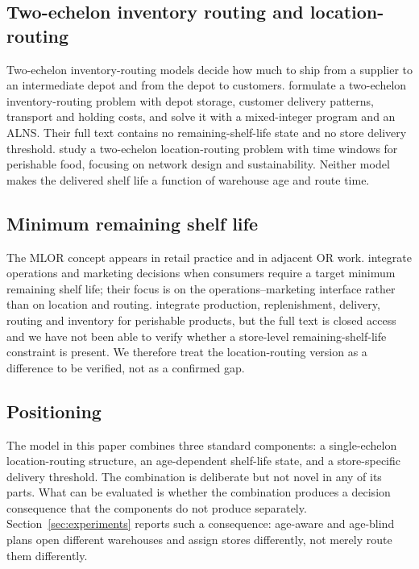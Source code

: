 \documentclass[preprint,12pt]{elsarticle}
\begin{document}
\subsection{Two-echelon inventory routing and location-routing}

Two-echelon inventory-routing models decide how much to ship from a supplier to an intermediate depot and from the depot to customers. \citet{rohmer2019} formulate a two-echelon inventory-routing problem with depot storage, customer delivery patterns, transport and holding costs, and solve it with a mixed-integer program and an ALNS. Their full text contains no remaining-shelf-life state and no store delivery threshold. \citet{govindan2014} study a two-echelon location-routing problem with time windows for perishable food, focusing on network design and sustainability. Neither model makes the delivered shelf life a function of warehouse age and route time.

\subsection{Minimum remaining shelf life}

The MLOR concept appears in retail practice and in adjacent OR work. \citet{singh2022} integrate operations and marketing decisions when consumers require a target minimum remaining shelf life; their focus is on the operations--marketing interface rather than on location and routing. \citet{qiu2019} integrate production, replenishment, delivery, routing and inventory for perishable products, but the full text is closed access and we have not been able to verify whether a store-level remaining-shelf-life constraint is present. We therefore treat the location-routing version as a difference to be verified, not as a confirmed gap.

\subsection{Positioning}

The model in this paper combines three standard components: a single-echelon location-routing structure, an age-dependent shelf-life state, and a store-specific delivery threshold. The combination is deliberate but not novel in any of its parts. What can be evaluated is whether the combination produces a decision consequence that the components do not produce separately. Section~\ref{sec:experiments} reports such a consequence: age-aware and age-blind plans open different warehouses and assign stores differently, not merely route them differently.
\end{document}
